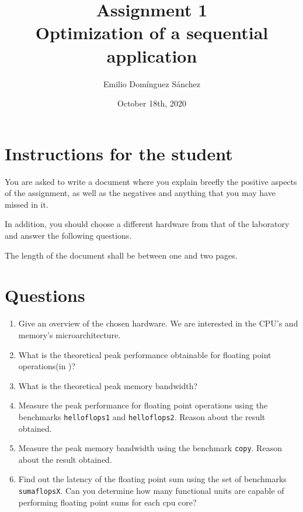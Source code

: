 \documentclass[
    12pt, %
]{fphw}
\title{Assignment 1 \\ Optimization of a sequential application} %
\author{Emilio Domínguez Sánchez} %
\date{October 18th, 2020} %
\institute{University of Murcia \\ Faculty of Informatics} %
\newcommand{\tech}{\texttt}
\begin{document}
\maketitle %


\section*{Instructions for the student}

    You are asked to write a document where you
explain breefly the positive aspects of the assignment,
as well as the negatives and
anything that you may have missed in it.

\noindent
In addition, you should choose a different hardware from that of the laboratory
and answer the following questions.

\noindent
The length of the document shall be between one and two pages.

\section*{Questions}

\begin{enumerate}
    \item Give an overview of the chosen hardware.
We are interested in the CPU's and memory's microarchitecture.

    \item What is the theoretical peak performance obtainable for
floating point operations(in \si{\gfps})?

    \item What is the theoretical peak memory bandwidth?

    \item Measure the peak performance for floating point operations
using the benchmarks \tech{helloflops1} and \tech{helloflops2}.
Reason about the result obtained.

    \item Measure the peak memory bandwidth using the benchmark \tech{copy}.
Reason about the result obtained.

    \item Find out the latency of the floating point sum
using the set of benchmarks \tech{sumaflopsX}.
Can you determine how many functional units are capable of performing
floating point sums for each cpu core?
\end{enumerate}
\end{document}

